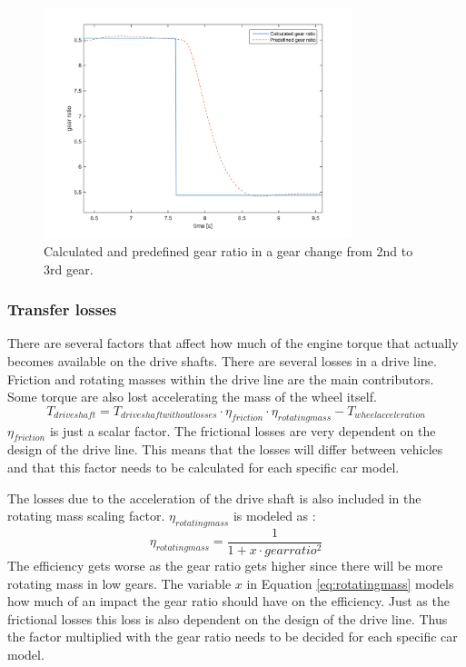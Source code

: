 \begin{figure}[h]
	\centering
	\includegraphics[width=0.8\textwidth]{Pictures/gear_ratio}
	\caption{Calculated and predefined gear ratio in a gear change from 2nd to 3rd gear.}
	\label{gear_ratio}
\end{figure}

\subsubsection{Transfer losses}
There are several factors that affect how much of the engine torque that actually becomes available on the drive shafts. There are several losses in a drive line. Friction and rotating masses within the drive line are the main contributors. Some torque are also lost accelerating the mass of the wheel itself.
\begin{equation}
T_{driveshaft} = T_{driveshaftwithoutlosses}\cdot\eta_{friction}\cdot\eta_{rotating mass} - T_{wheelacceleration}
\end{equation}
$ \eta_{friction} $ is just a scalar factor. The frictional losses are very dependent on the design of the drive line. This means that the losses will differ between vehicles and that this factor needs to be calculated for each specific car model. 

The losses due to the acceleration of the drive shaft is also included in the rotating mass scaling factor. $ \eta_{rotating mass} $ is modeled as \cite{mason}:
\begin{equation} \label{eq:rotatingmass}
	\eta_{rotating mass} = \frac{1}{1 + x\cdot gearratio^2}
\end{equation}
The efficiency gets worse as the gear ratio gets higher since there will be more rotating mass in low gears. The variable $ x $ in Equation \ref{eq:rotatingmass} models how much of an impact the gear ratio should have on the efficiency. Just as the frictional losses this loss is also dependent on the design of the drive line. Thus the factor multiplied with the gear ratio needs to be decided for each specific car model.

